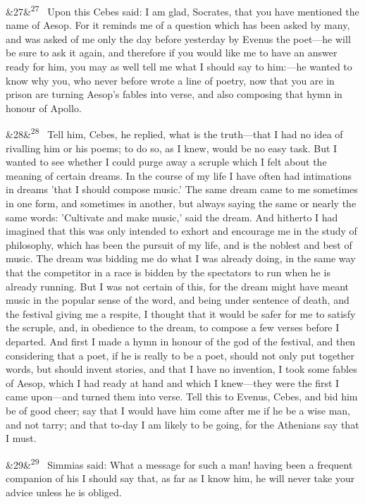\documentclass[12pt]{article}
\newcommand{\para}[1][]{\par\noindent\ifx&#1&\else\textsuperscript{\footnotesize #1}~\fi}
\begin{document}
\para[27] Upon this Cebes said: I am glad, Socrates, that you have mentioned the name of Aesop. For it reminds me of a question which has been asked by many, and was asked of me only the day before yesterday by Evenus the poet---he will be sure to ask it again, and therefore if you would like me to have an answer ready for him, you may as well tell me what I should say to him:---he wanted to know why you, who never before wrote a line of poetry, now that you are in prison are turning Aesop's fables into verse, and also composing that hymn in honour of Apollo.

\para[28] Tell him, Cebes, he replied, what is the truth---that I had no idea of rivalling him or his poems; to do so, as I knew, would be no easy task. But I wanted to see whether I could purge away a scruple which I felt about the meaning of certain dreams. In the course of my life I have often had intimations in dreams 'that I should compose music.' The same dream came to me sometimes in one form, and sometimes in another, but always saying the same or nearly the same words: 'Cultivate and make music,' said the dream. And hitherto I had imagined that this was only intended to exhort and encourage me in the study of philosophy, which has been the pursuit of my life, and is the noblest and best of music. The dream was bidding me do what I was already doing, in the same way that the competitor in a race is bidden by the spectators to run when he is already running. But I was not certain of this, for the dream might have meant music in the popular sense of the word, and being under sentence of death, and the festival giving me a respite, I thought that it would be safer for me to satisfy the scruple, and, in obedience to the dream, to compose a few verses before I departed. And first I made a hymn in honour of the god of the festival, and then considering that a poet, if he is really to be a poet, should not only put together words, but should invent stories, and that I have no invention, I took some fables of Aesop, which I had ready at hand and which I knew---they were the first I came upon---and turned them into verse. Tell this to Evenus, Cebes, and bid him be of good cheer; say that I would have him come after me if he be a wise man, and not tarry; and that to-day I am likely to be going, for the Athenians say that I must.

\para[29] Simmias said: What a message for such a man! having been a frequent companion of his I should say that, as far as I know him, he will never take your advice unless he is obliged.
\end{document}
